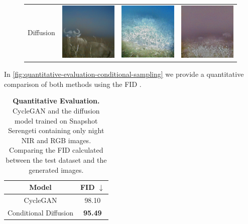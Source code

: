 \begin{figure}
\begin{tabularx}{.6\textwidth}{>{\small}m{.03\linewidth} Y Y Y}
        \begin{sideways}Diffusion\end{sideways} & \includegraphics{gfx/conditional-diffusion-sampling-hallucinations-qual/diffusion_S2_C07_R3_PICT0462.png} & \includegraphics{gfx/conditional-diffusion-sampling-hallucinations-qual/diffusion_S2_G13_R1_PICT0332.png} & \includegraphics{gfx/conditional-diffusion-sampling-hallucinations-qual/diffusion_S2_T11_R2_PICT0208.png}
    \end{tabularx}
    \caption{
    }
    \label{fig:qualitative-evaluation-conditional-sampling-hallucinations}
\end{figure}

In \autoref{fig:quantitative-evaluation-conditional-sampling} we provide a quantitative comparison of both methods using the FID \parencite{ttur}.

\begin{table}[htp!]
    \centering
    \begin{tabular}{c | c}
        Model                 & FID  $\downarrow$ \\
        \hline\hline
        CycleGAN              & 98.10             \\
        Conditional Diffusion & \textbf{95.49}
    \end{tabular}
    \caption{
        \textbf{Quantitative Evaluation.} CycleGAN and the diffusion model trained on Snapshot Serengeti \parencite{serengeti} containing only night NIR and RGB images.
        Comparing the FID calculated between the test dataset and the generated images.
    }
    \label{fig:quantitative-evaluation-conditional-sampling}
\end{table}

